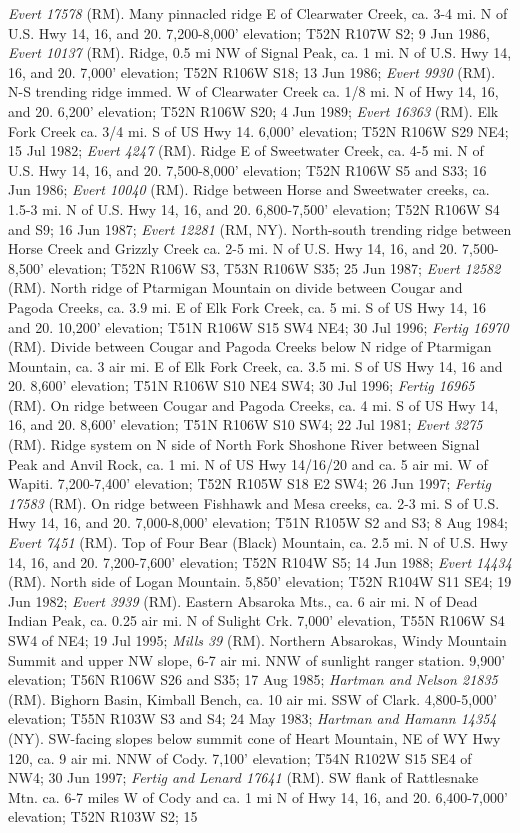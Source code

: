 \textit{Evert 17578} (RM).  Many pinnacled ridge E of Clearwater Creek, ca. 3-4 mi. N of U.S. Hwy 14, 16, and 20. 7,200-8,000’ elevation; T52N R107W S2; 9 Jun 1986, \textit{Evert 10137} (RM).  Ridge, 0.5 mi NW of Signal Peak, ca. 1 mi. N of U.S. Hwy 14, 16, and 20. 7,000’ elevation; T52N R106W S18; 13 Jun 1986; \textit{Evert 9930} (RM).  N-S trending ridge immed. W of Clearwater Creek ca. 1/8 mi. N of Hwy 14, 16, and 20. 6,200’ elevation; T52N R106W S20; 4 Jun 1989; \textit{Evert 16363} (RM).  Elk Fork Creek ca. 3/4 mi. S of US Hwy 14. 6,000’ elevation; T52N R106W S29 NE4; 15 Jul 1982; \textit{Evert 4247} (RM).  Ridge E of Sweetwater Creek, ca. 4-5 mi. N of U.S. Hwy 14, 16, and 20. 7,500-8,000’ elevation;  T52N R106W S5 and S33; 16 Jun 1986; \textit{Evert 10040} (RM).  Ridge between Horse and Sweetwater creeks, ca. 1.5-3 mi. N of U.S. Hwy 14, 16, and 20. 6,800-7,500’ elevation; T52N R106W S4 and S9; 16 Jun 1987; \textit{Evert 12281} (RM, NY).  North-south trending ridge between Horse Creek and Grizzly Creek ca. 2-5 mi. N of U.S. Hwy 14, 16, and 20. 7,500-8,500’ elevation; T52N R106W S3, T53N R106W S35; 25 Jun 1987; \textit{Evert 12582} (RM).  North ridge of Ptarmigan Mountain on divide between Cougar and Pagoda Creeks, ca. 3.9 mi. E of Elk Fork Creek, ca. 5 mi. S of US Hwy 14, 16 and 20. 10,200’ elevation; T51N R106W S15 SW4 NE4; 30 Jul 1996; \textit{Fertig 16970} (RM).  Divide between Cougar and Pagoda Creeks below N ridge of Ptarmigan Mountain, ca. 3 air mi. E of Elk Fork Creek, ca. 3.5 mi. S of US Hwy 14, 16 and 20. 8,600’ elevation; T51N R106W S10 NE4 SW4; 30 Jul 1996; \textit{Fertig 16965} (RM).  On ridge between Cougar and Pagoda Creeks, ca. 4 mi. S of US Hwy 14, 16, and 20. 8,600’ elevation; T51N R106W S10 SW4; 22 Jul 1981; \textit{Evert 3275} (RM).  Ridge system on N side of North Fork Shoshone River between Signal Peak and Anvil Rock, ca. 1 mi. N of US Hwy 14/16/20 and ca. 5 air mi. W of Wapiti. 7,200-7,400’ elevation; T52N R105W S18 E2 SW4; 26 Jun 1997; \textit{Fertig 17583} (RM).  On ridge between Fishhawk and Mesa creeks, ca. 2-3 mi. S of U.S. Hwy 14, 16, and 20. 7,000-8,000’ elevation; T51N R105W S2 and S3; 8 Aug 1984; \textit{Evert 7451} (RM).  Top of Four Bear (Black) Mountain, ca. 2.5 mi. N of U.S. Hwy 14, 16, and 20. 7,200-7,600’ elevation; T52N R104W S5; 14 Jun 1988; \textit{Evert 14434} (RM).  North side of Logan Mountain. 5,850’ elevation; T52N R104W S11 SE4; 19 Jun 1982; \textit{Evert 3939} (RM).  Eastern Absaroka Mts., ca. 6 air mi. N of Dead Indian Peak, ca. 0.25 air mi. N of Sulight Crk.  7,000’ elevation, T55N R106W S4 SW4 of NE4; 19 Jul 1995; \textit{Mills 39} (RM).  Northern Absarokas, Windy Mountain Summit and upper NW slope, 6-7 air mi. NNW of sunlight ranger station.  9,900’ elevation; T56N R106W S26 and S35; 17 Aug 1985; \textit{Hartman and Nelson 21835} (RM).  Bighorn Basin, Kimball Bench, ca. 10 air mi. SSW of Clark.  4,800-5,000’ elevation; T55N R103W S3 and S4; 24 May 1983; \textit{Hartman and Hamann 14354} (NY).  SW-facing slopes below summit cone of Heart Mountain, NE of WY Hwy 120, ca. 9 air mi. NNW of Cody.  7,100’ elevation; T54N R102W S15 SE4 of NW4; 30 Jun 1997; \textit{Fertig and Lenard 17641} (RM).  SW flank of Rattlesnake Mtn. ca. 6-7 miles W of Cody and ca. 1 mi N of Hwy 14, 16, and 20. 6,400-7,000' elevation; T52N R103W S2; 15 
